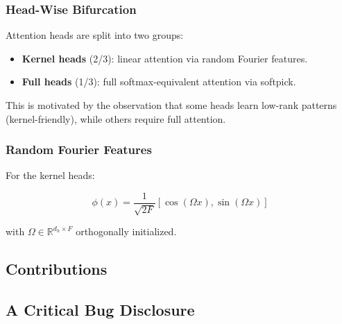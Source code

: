\subsubsection{Head-Wise Bifurcation}

Attention heads are split into two groups:

\begin{itemize}
\item \textbf{Kernel heads} (2/3): linear attention via random Fourier features.
\item \textbf{Full heads} (1/3): full softmax-equivalent attention via softpick.

\end{itemize}
This is motivated by the observation that some heads learn low-rank 
patterns (kernel-friendly), while others require full attention.

\subsubsection{Random Fourier Features}

For the kernel heads:

\[
\phi(x) = \frac{1}{\sqrt{2F}} [\cos(\Omega x), \sin(\Omega x)]
\]

with $\Omega \in \mathbb{R}^{d_h \times F}$ orthogonally initialized.

\subsection{Contributions}

\subsection{A Critical Bug Disclosure}

